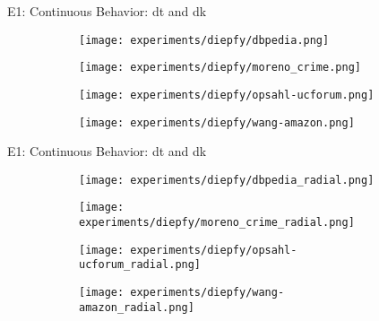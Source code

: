 \begin{frame}[fragile]{E1: Continuous Behavior: \acrshort{dt} and \acrshort{dk}}
  \begin{figure}[!htp]
    \centering
    \begin{subfigure}[t]{0.45\textwidth}
     \texttt{[image: experiments/diepfy/dbpedia.png]}
    \end{subfigure}\hfill
    \begin{subfigure}[t]{0.45\textwidth}
     \texttt{[image: experiments/diepfy/moreno\_crime.png]}
    \end{subfigure}
    \vspace{0.5cm}
  
    \begin{subfigure}[t]{0.45\textwidth}
     \texttt{[image: experiments/diepfy/opsahl-ucforum.png]}
    \end{subfigure}\hfill
    \begin{subfigure}[t]{0.45\textwidth}
      \texttt{[image: experiments/diepfy/wang-amazon.png]}
     \end{subfigure}
   \end{figure}
  \end{frame}

  \begin{frame}[fragile]{E1: Continuous Behavior: \acrshort{dt} and \acrshort{dk}}
    \begin{figure}[!htp]
      \centering
      \begin{subfigure}[t]{0.45\textwidth}
      \texttt{[image: experiments/diepfy/dbpedia\_radial.png]}
      \end{subfigure}\hfill
      \begin{subfigure}[t]{0.45\textwidth}
      \texttt{[image: experiments/diepfy/moreno\_crime\_radial.png]}
      \end{subfigure}
      \vspace{0.5cm}
      \begin{subfigure}[t]{0.45\textwidth}
      \texttt{[image: experiments/diepfy/opsahl-ucforum\_radial.png]}
      \end{subfigure}\hfill
      \begin{subfigure}[t]{0.45\textwidth}
        \texttt{[image: experiments/diepfy/wang-amazon\_radial.png]}
      \end{subfigure}
    \end{figure}
    \end{frame}

